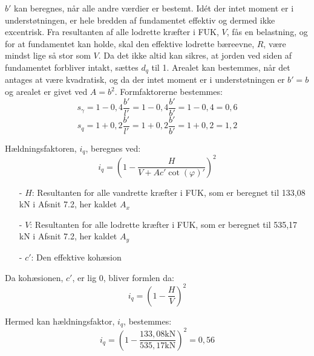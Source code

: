 $b'$ kan beregnes, når alle andre værdier er bestemt.
\newline
\newline
Idét der intet moment er i understøtningen, er hele bredden af fundamentet effektiv og dermed ikke excentrisk. Fra resultanten af alle lodrette kræfter i FUK, $V$, fås en belastning, og for at fundamentet kan holde, skal den effektive lodrette bæreevne, $R$, være mindst lige så stor som $V$.
\newline
\newline
Da det ikke altid kan sikres, at jorden ved siden af fundamentet forbliver intakt, sættes $d_q$ til 1.
\newline
\newline
Arealet kan bestemmes, når det antages at være kvadratisk, og da der intet moment er i understøtningen er $b'=b$ og arealet er givet ved $A=b^2$.
\newline
\newline
Formfaktorerne bestemmes:
\begin{equation}
	s_\gamma = 1 - 0,\!4 \frac{b'}{l'} = 1 - 0,\!4  \frac{b'}{b'} = 1 - 0,\!4 = 0,\!6
\end{equation}
\begin{equation}
	s_q = 1 + 0,\!2 \frac{b'}{l'} = 1 + 0,\!2 \frac{b'}{b'} = 1 + 0,\!2 = 1,\!2
\end{equation}

Hældningsfaktoren, $i_q$, beregnes ved:
\begin{equation}
	i_q = (1 - \frac{H}{V + A c' \cot(\varphi)'})^2
\end{equation}

\begin{itemize}
	\item[-] $H$: Resultanten for alle vandrette kræfter i FUK, som er beregnet til 133,08 kN i Afsnit 7.2, her kaldet $A_x$
	\item[-] $V$: Resultanten for alle lodrette kræfter i FUK, som er beregnet til 535,17 kN i Afsnit 7.2, her kaldet $A_y$
	\item[-] $c'$: Den effektive kohæsion
\end{itemize}

Da kohæsionen, $c'$, er lig 0, bliver formlen da:
\begin{equation}
	i_q = (1 - \frac{H}{V})^2
\end{equation}

Hermed kan hældningsfaktor, $i_q$, bestemmes:
\begin{equation}
	i_q = (1 - \frac{133,\!08 \text{kN}}{535,\!17 \text{kN}})^2 = 0,\!56
\end{equation}

